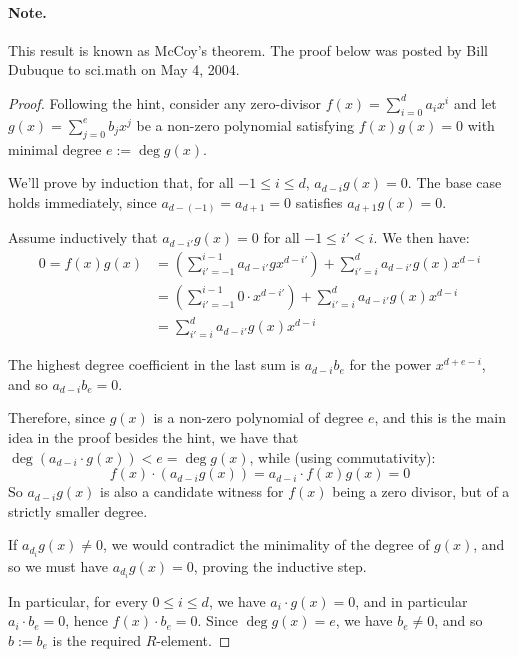 \paragraph{Note.}
This result is known as McCoy's theorem. The proof below was posted by
Bill Dubuque to sci.math on May 4, 2004.
\begin{proof}
  Following the hint, consider any zero-divisor $f(x) = \sum_{i = 0}^d
  a_ix^i$ and let $g(x) = \sum_{j = 0}^e b_jx^j$ be a non-zero
  polynomial satisfying $f(x)g(x) = 0$ with minimal degree $e := \deg g(x)$.

  We'll prove by induction that, for all $-1 \leq i \leq d$, $a_{d -
  i}g(x) = 0$. The base case holds immediately, since $a_{d-(-1)} = a_{d
  + 1} = 0$ satisfies $a_{d+1}g(x) = 0$.

  Assume inductively that $a_{d - i'}g(x) = 0$ for all $-1 \leq i' <
  i$. We then have:
  \begin{align*}
  0  = f(x)g(x)
    &= \left(\sum_{i' = -1}^{i-1} a_{d-i'}gx^{d-i'}\right)
      + \sum_{i' = i}^da_{d - i'}g(x)x^{d - i}
  \\&= \left(\sum_{i' = -1}^{i-1} 0\cdot x^{d-i'}\right)
      + \sum_{i' = i}^da_{d - i'}g(x)x^{d - i}
  \\&=   \sum_{i' = i}^da_{d - i'}g(x)x^{d - i}
  \end{align*}

  The highest degree coefficient in the last sum is $a_{d-i}b_e$ for
  the power $x^{d + e - i}$, and so $a_{d-i}b_e = 0$.

  Therefore, since $g(x)$ is a non-zero polynomial of degree $e$, and
  this is the main idea in the proof besides the hint, we have that
  $\deg(a_{d-i}\cdot g(x)) < e = \deg g(x)$, while (using commutativity):
  \[
    f(x)\cdot (a_{d-i}g(x)) = a_{d-i}\cdot f(x)g(x) = 0
  \]
  So $a_{d-i}g(x)$ is also a candidate witness for $f(x)$ being a zero
  divisor, but of a strictly smaller degree.

  If $a_{d_i}g(x) \neq 0$, we would contradict the minimality of the
  degree of $g(x)$, and so we must have $a_{d_i}g(x) = 0$, proving the
  inductive step.

  In particular, for every $0 \leq i \leq d$, we have $a_i\cdot g(x) =
  0$, and in particular $a_i \cdot b_e = 0$, hence $f(x)\cdot b_e =
  0$. Since $\deg g(x) = e$, we have $b_e \neq 0$, and so $b := b_e$
  is the required $R$-element.
\end{proof}
